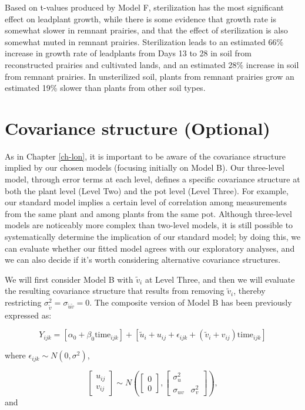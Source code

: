 \documentclass[
]{krantz}
\begin{document}
Based on t-values produced by Model F, sterilization has the most significant effect on leadplant growth, while there is some evidence that growth rate is somewhat slower in remnant prairies, and that the effect of sterilization is also somewhat muted in remnant prairies. Sterilization leads to an estimated 66\% increase in growth rate of leadplants from Days 13 to 28 in soil from reconstructed prairies and cultivated lands, and an estimated 28\% increase in soil from remnant prairies. In unsterilized soil, plants from remnant prairies grow an estimated 19\% slower than plants from other soil types.

\hypertarget{error-3level}{%
\section{Covariance structure (Optional)}\label{error-3level}}

As in Chapter \ref{ch-lon}, it is important to be aware of the covariance structure  implied by our chosen models (focusing initially on Model B). Our three-level model, through error terms at each level, defines a specific covariance structure at both the plant level (Level Two) and the pot level (Level Three). For example, our standard model implies a certain level of correlation among measurements from the same plant and among plants from the same pot. Although three-level models are noticeably more complex than two-level models, it is still possible to systematically determine the implication of our standard model; by doing this, we can evaluate whether our fitted model agrees with our exploratory analyses, and we can also decide if it's worth considering alternative covariance structures.

We will first consider Model B with \(\tilde{v}_{i}\) at Level Three, and then we will evaluate the resulting covariance structure that results from removing \(\tilde{v}_{i}\), thereby restricting \(\sigma_{\tilde{v}}^{2}=\sigma_{\tilde{u}\tilde{v}}=0\). The composite version of Model B has been previously expressed as:

\begin{equation*}
Y_{ijk}=[\alpha_{0}+\beta_{0}\textrm{time}_{ijk}]+
[\tilde{u}_{i}+u_{ij}+\epsilon_{ijk}+(\tilde{v}_{i}+v_{ij})\textrm{time}_{ijk}]
\end{equation*}

where \(\epsilon_{ijk}\sim N(0,\sigma^2)\),

\[ \left[ \begin{array}{c}
            u_{ij} \\ v_{ij}
          \end{array}  \right] \sim N \left( \left[
          \begin{array}{c}
            0 \\ 0
          \end{array} \right], \left[
          \begin{array}{cc}
            \sigma_{u}^{2} & \\
            \sigma_{uv} & \sigma_{v}^{2}
          \end{array} \right] \right), \] and
\end{document}
